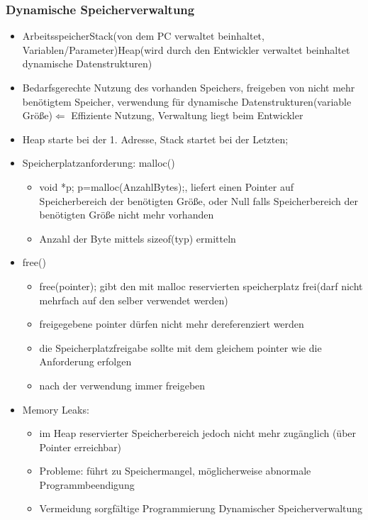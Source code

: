 \documentclass[10pt,a5paper]{article}
\begin{document}
\subsubsection{Dynamische Speicherverwaltung}
\begin{itemize}
\item Arbeitsspeicher\subitem Stack(von dem PC verwaltet beinhaltet, Variablen/Parameter)\subitem Heap(wird durch den Entwickler verwaltet beinhaltet dynamische Datenstrukturen)
\item Bedarfsgerechte Nutzung des vorhanden Speichers, freigeben von nicht mehr benötigtem Speicher, verwendung für dynamische Datenstrukturen(variable Größe)\subitem\ensuremath{\Leftarrow} Effiziente Nutzung, Verwaltung liegt beim Entwickler
\item Heap starte bei der 1. Adresse, Stack startet bei der Letzten;
\item Speicherplatzanforderung:
\subitem malloc()\begin{itemize}
\item void *p; p=malloc(Anzahl\textunderscore Bytes);, liefert einen Pointer auf Speicherbereich der benötigten Größe, oder Null falls Speicherbereich der benötigten Größe nicht mehr vorhanden
\item Anzahl der Byte mittels sizeof(typ) ermitteln

\end{itemize}
\item free()\begin{itemize}
\item free(pointer); gibt den mit malloc reservierten speicherplatz frei(darf nicht mehrfach auf den selber verwendet werden)
\item freigegebene pointer dürfen nicht mehr dereferenziert werden
\item die Speicherplatzfreigabe sollte mit dem gleichem pointer wie die Anforderung erfolgen
\item nach der verwendung immer freigeben
\end{itemize}
\item Memory Leaks:\begin{itemize}
\item im Heap reservierter Speicherbereich  jedoch nicht mehr zugänglich (über Pointer erreichbar)
\item Probleme:
\subitem führt zu Speichermangel,
\subitem möglicherweise abnormale Programmbeendigung
\item Vermeidung
\subitem sorgfältige Programmierung Dynamischer Speicherverwaltung
\end{itemize}
\end{itemize}
\end{document}
